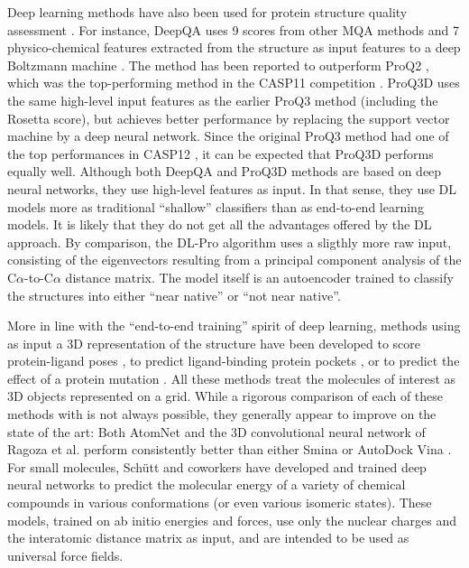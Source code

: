 Deep learning methods have also been used for protein structure
quality assessment \cite{nguyen2014dlpro, cao2016deepqa,
uziela2017proq3d}. For instance, DeepQA \cite{cao2016deepqa} uses 9
scores from other MQA methods and 7 physico-chemical features
extracted from the structure as input features to a deep Boltzmann
machine \cite{}. The method has been reported \cite{cao2016deepqa} to
outperform ProQ2 \cite{ray2012proq2}, which was the top-performing
method in the CASP11 competition \cite{kryshtafovych2015}.
ProQ3D \cite{uziela2017proq3d} uses the same high-level input features
as the earlier ProQ3 method \cite{uziela2016proq3} (including the
Rosetta \cite{leaverfay2011rosetta} score), but achieves better
performance by replacing the support vector machine by a deep neural
network. Since the original ProQ3 method had one of the top
performances in CASP12 \cite{elofsson2017qacasp12}, it can be expected
that ProQ3D performs equally well. Although both DeepQA and ProQ3D
methods are based on deep neural networks, they use high-level
features as input. In that sense, they use DL models more as
traditional ``shallow'' classifiers than as end-to-end learning
models. It is likely that they do not get all the advantages offered
by the DL approach.
%
By comparison, the DL-Pro algorithm \cite{nguyen2014dlpro} uses a
sligthly more raw input, consisting of the eigenvectors resulting from
a principal component analysis of the C$\alpha$-to-C$\alpha$ distance
matrix. The model itself is an autoencoder \cite{} trained to classify
the structures into either ``near native'' or ``not near native''.

More in line with the ``end-to-end training'' spirit of deep learning,
methods using as input a 3D representation of the structure have been
developed to score protein-ligand poses \cite{wallach2015atomnet,
ragoza2017ligandscoring}, to predict ligand-binding protein
pockets \cite{jimenez2017deepsite}, or to predict the effect of a
protein mutation \cite{torng2017}. All these
methods\cite{wallach2015atomnet, ragoza2017ligandscoring,
jimenez2017deepsite, torng2017} treat the molecules of interest as 3D
objects represented on a grid. While a rigorous comparison of each of
these methods with is not always possible, they generally appear to
improve on the state of the art: Both
AtomNet \cite{wallach2015atomnet} and the 3D convolutional neural
network of Ragoza et al. \cite{ragoza2017ligandscoring} perform
consistently better than either Smina \cite{koes2013smina} or AutoDock
Vina \cite{trott2009vina}.
%
For small molecules, Sch\"{u}tt and coworkers \cite{schutt2017nc,
schutt2017moleculenet} have developed and trained deep neural networks
to predict the molecular energy of a variety of chemical compounds in
various conformations (or even various isomeric states). These models,
trained on ab initio energies and forces, use only the nuclear charges
and the interatomic distance matrix as input, and are intended to be
used as universal force fields.
